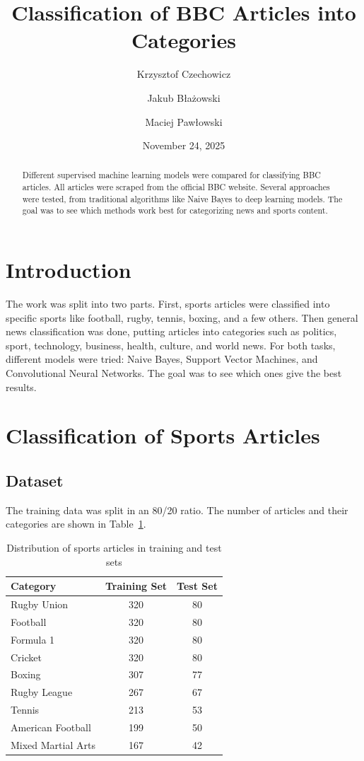 \documentclass[12pt,a4paper]{article}
\title{Classification of BBC Articles into Categories}
\author{Krzysztof Czechowicz \and Jakub Błażowski \and Maciej Pawłowski}
\date{November 24, 2025}
\begin{document}
\maketitle

\begin{abstract}
Different supervised machine learning models were compared for classifying BBC articles. All articles were scraped from the official BBC website. Several approaches were tested, from traditional algorithms like Naive Bayes to deep learning models. The goal was to see which methods work best for categorizing news and sports content.
\end{abstract}

\section{Introduction}

The work was split into two parts. First, sports articles were classified into specific sports like football, rugby, tennis, boxing, and a few others. Then general news classification was done, putting articles into categories such as politics, sport, technology, business, health, culture, and world news. For both tasks, different models were tried: Naive Bayes, Support Vector Machines, and Convolutional Neural Networks. The goal was to see which ones give the best results.

\section{Classification of Sports Articles}

\subsection{Dataset}

The training data was split in an 80/20 ratio. The number of articles and their categories are shown in Table~\ref{tab:sports_dataset}.

\begin{table}[h]
\centering
\begin{tabular}{lcc}
\toprule
Category & Training Set & Test Set \\
\midrule
Rugby Union & 320 & 80 \\
Football & 320 & 80 \\
Formula 1 & 320 & 80 \\
Cricket & 320 & 80 \\
Boxing & 307 & 77 \\
Rugby League & 267 & 67 \\
Tennis & 213 & 53 \\
American Football & 199 & 50 \\
Mixed Martial Arts & 167 & 42 \\
\bottomrule
\end{tabular}
\caption{Distribution of sports articles in training and test sets}
\label{tab:sports_dataset}
\end{table}
\end{document}
